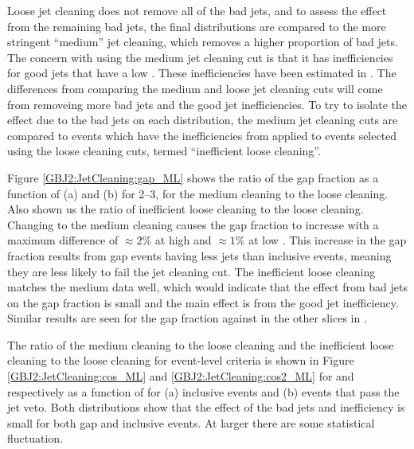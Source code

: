 Loose jet cleaning does not remove all of the bad jets, and to assess the effect from the remaining bad jets, the final distributions are compared to the more stringent ``medium'' jet cleaning, which  removes a higher proportion of bad jets. 
The concern with using the medium jet cleaning cut is that it has inefficiencies for good jets that have a low \pt{}.
These inefficiencies have been estimated in \cite{ref:JES}.
The differences from comparing the medium and loose jet cleaning cuts will come from removeing more bad jets and the good jet inefficiencies.
To try to isolate the effect due to the bad jets on each distribution, the medium jet cleaning cuts are compared to events which have the inefficiencies from \cite{ref:JES} applied to events selected using the loose cleaning cuts, termed ``inefficient loose cleaning''. 


Figure \ref{GBJ2:JetCleaning:gap_ML} shows the ratio of the gap fraction as a function of (a) \dy{} and (b) \qz{} for \dy{} 2--3,  for the medium cleaning to the loose cleaning.
Also shown us the ratio of inefficient loose cleaning to the loose cleaning.
Changing to the medium cleaning causes the gap fraction to increase with a maximum difference of $\approx 2\%$ at high \dy{} and $\approx 1\%$ at low \qz{}.
This increase in the gap fraction results from gap events having less jets than inclusive events, meaning they are less likely to fail the jet cleaning cut. 
The inefficient loose cleaning matches the medium data well, which would indicate that the effect from bad jets on the gap fraction is small and the main effect is from the good jet inefficiency. 
Similar results are seen for the gap fraction against \qz{} in the other slices in \dy{}.  


The ratio of the medium cleaning to the loose cleaning and the inefficient loose cleaning to the loose cleaning for event-level criteria is shown in Figure \ref{GBJ2:JetCleaning:cos_ML} and \ref{GBJ2:JetCleaning:cos2_ML} for \mean{\cosdphi{}} and \mean{\costwodphi{}} respectively as a function of \dy{} for (a) inclusive events and (b) events that pass the jet veto. 
Both distributions show that the effect of the bad jets and inefficiency is small for both gap and inclusive events.
At larger \dy{} there are some statistical fluctuation.

